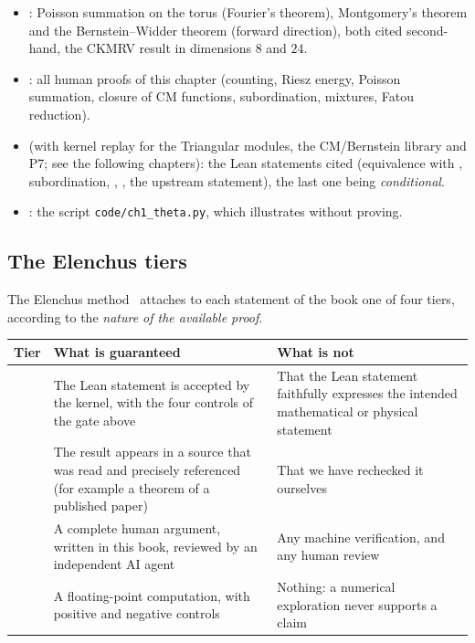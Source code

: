 \begin{warnbox}
\begin{itemize}
\item \tierL{}: Poisson summation on the torus (Fourier's theorem), Montgomery's theorem and the Bernstein--Widder theorem (forward direction), both cited second-hand, the CKMRV result in dimensions $8$ and $24$.
\item \tierC{}: all human proofs of this chapter (counting, Riesz energy, Poisson summation, closure of CM functions, subordination, mixtures, Fatou reduction).
\item \tierA{} (with kernel replay for the Triangular modules, the CM/Bernstein library and P7; see the following chapters): the Lean statements cited (equivalence with , subordination, , , the upstream statement), the last one being \emph{conditional}.
\item \tierX{}: the script \texttt{code/ch1\_theta.py}, which illustrates without proving.
\end{itemize}
\end{warnbox}

\subsection{The Elenchus tiers}
\label{ch1:sec:tiers}

The Elenchus method~\cite{elenchus} attaches to each statement of the book one of four tiers, according to the \emph{nature of the available proof}.

\begin{center}\small
\begin{tabular}{@{}p{}p{}p{}@{}}
\toprule
Tier & What is guaranteed & What is not \\
\midrule
\tierA{} & The Lean statement is accepted by the kernel, with the four controls of the gate above & That the Lean statement faithfully expresses the intended mathematical or physical statement \\
\tierL{} & The result appears in a source that was read and precisely referenced (for example a theorem of a published paper) & That we have rechecked it ourselves \\
\tierC{} & A complete human argument, written in this book, reviewed by an independent AI agent & Any machine verification, and any human review \\
\tierX{} & A floating-point computation, with positive and negative controls & Nothing: a numerical exploration never supports a claim \\
\bottomrule
\end{tabular}
\end{center}

